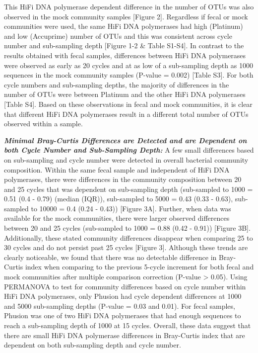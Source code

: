 \documentclass[12pt,]{article}
\begin{document}
This HiFi DNA polymerase dependent difference in the number of OTUs was
also observed in the mock community samples {[}Figure 2{]}. Regardless
if fecal or mock communities were used, the same HiFi DNA polymerases
had high (Platinum) and low (Accuprime) number of OTUs and this was
consistent across cycle number and sub-sampling depth {[}Figure 1-2 \&
Table S1-S4{]}. In contrast to the results obtained with fecal samples,
differences between HiFi DNA polymerases were observed as early as 20
cycles and at as low of a sub-sampling depth as 1000 sequences in the
mock community samples (P-value = 0.002) {[}Table S3{]}. For both cycle
numbers and sub-sampling depths, the majority of differences in the
number of OTUs were between Platinum and the other HiFi DNA polymerases
{[}Table S4{]}. Based on these observations in fecal and mock
communities, it is clear that different HiFi DNA polymerases result in a
different total number of OTUs observed within a sample.

\textbf{\emph{Minimal Bray-Curtis Differences are Detected and are
Dependent on both Cycle Number and Sub-Sampling Depth:}} A few small
differences based on sub-sampling and cycle number were detected in
overall bacterial community composition. Within the same fecal sample
and independent of HiFi DNA polymerases, there were differences in the
community composition between 20 and 25 cycles that was dependent on
sub-sampling depth (sub-sampled to 1000 = 0.51 (0.4 - 0.79) (median
(IQR)), sub-sampled to 5000 = 0.43 (0.33 - 0.63), sub-sampled to 10000 =
0.4 (0.24 - 0.43)) {[}Figure 3A{]}. Further, when data was available for
the mock communities, there were larger observed differences between 20
and 25 cycles (sub-sampled to 1000 = 0.88 (0.42 - 0.91)) {[}Figure
3B{]}. Additionally, these stated community differences disappear when
comparing 25 to 30 cycles and do not persist past 25 cycles {[}Figure
3{]}. Although these trends are clearly noticeable, we found that there
was no detectable difference in Bray-Curtis index when comparing to the
previous 5-cycle increment for both fecal and mock communities after
multiple comparison correction (P-value \textgreater{} 0.05). Using
PERMANOVA to test for community differences based on cycle number within
HiFi DNA polymerases, only Phusion had cycle dependent differences at
1000 and 5000 sub-sampling depths (P-value = 0.03 and 0.01). For fecal
samples, Phusion was one of two HiFi DNA polymerases that had enough
sequences to reach a sub-sampling depth of 1000 at 15 cycles. Overall,
these data suggest that there are small HiFi DNA polymerase differences
in Bray-Curtis index that are dependent on both sub-sampling depth and
cycle number.
\end{document}
